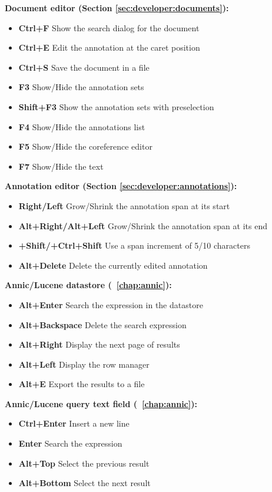 {\bf Document editor (Section \ref{sec:developer:documents}):}

\begin{itemize}
\item {\bf Ctrl+F} Show the search dialog for the document
\item {\bf Ctrl+E} Edit the annotation at the caret position
\item {\bf Ctrl+S} Save the document in a file
\item {\bf F3} Show/Hide the annotation sets
\item {\bf Shift+F3} Show the annotation sets with preselection
\item {\bf F4} Show/Hide the annotations list
\item {\bf F5} Show/Hide the coreference editor
\item {\bf F7} Show/Hide the text
\end{itemize}

{\bf Annotation editor (Section \ref{sec:developer:annotations}):}

\begin{itemize}
\item {\bf Right/Left} Grow/Shrink the annotation span at its start
\item {\bf Alt+Right/Alt+Left} Grow/Shrink the annotation span at its end
\item {\bf +Shift/+Ctrl+Shift} Use a span increment of 5/10 characters
\item {\bf Alt+Delete} Delete the currently edited annotation
\end{itemize}

{\bf Annic/Lucene datastore (\Chapthing~\ref{chap:annic}):}

\begin{itemize}
\item {\bf Alt+Enter} Search the expression in the datastore
\item {\bf Alt+Backspace} Delete the search expression
\item {\bf Alt+Right} Display the next page of results
\item {\bf Alt+Left} Display the row manager
\item {\bf Alt+E} Export the results to a file
\end{itemize}

{\bf Annic/Lucene query text field (\Chapthing~\ref{chap:annic}):}

\begin{itemize}
\item {\bf Ctrl+Enter} Insert a new line
\item {\bf Enter} Search the expression
\item {\bf Alt+Top} Select the previous result
\item {\bf Alt+Bottom} Select the next result
\end{itemize}


